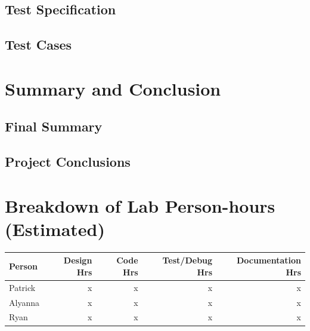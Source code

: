 \documentclass[12pt]{article} %
\begin{document}
\subsection{Test Specification} %
%
%

\subsection{Test Cases} %
%

\section{Summary and Conclusion}
%

\subsection{Final Summary}


\subsection{Project Conclusions} %


\pagebreak
\appendix


\section{Breakdown of Lab Person-hours (Estimated)}
\begin{tabular}{|l|*{4}{r|}}
	\hline
	Person & Design Hrs & Code Hrs & Test/Debug Hrs & Documentation Hrs \\ \hline
	Patrick & x & x & x & x  \\ \hline
	Alyanna & x & x & x & x \\ \hline
	Ryan & x & x & x & x  \\ \hline
\end{tabular}
\end{document}

